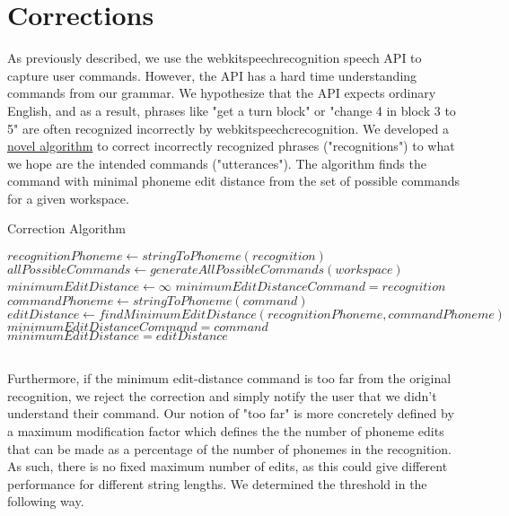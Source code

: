 \documentclass[]{article}
\begin{document}
\clearpage

\section{Corrections}

As previously described, we use the webkitspeechrecognition speech API to capture user commands. However, the API has a hard time understanding commands from our grammar. We hypothesize that the API expects ordinary English, and as a result, phrases like "get a turn block" or "change 4 in block 3 to 5" are often recognized incorrectly by webkitspeechcrecognition. We developed a \hyperref[CorrectionAlgorithm]{novel algorithm} to correct incorrectly recognized phrases ("recognitions") to what we hope are the intended commands ("utterances"). The algorithm finds the command with minimal phoneme edit distance from the set of possible commands for a given workspace.
\begin{algorithm}
	\caption{Correction Algorithm}\label{CorrectionAlgorithm}
	\begin{algorithmic}[1]
		\State $recognitionPhoneme \leftarrow stringToPhoneme(recognition)$
		\State $allPossibleCommands\leftarrow generateAllPossibleCommands(workspace) $
		\State $minimumEditDistance \leftarrow \infty$
		\State $minimumEditDistanceCommand = recognition$
			\State $commandPhoneme \leftarrow stringToPhoneme(command)$
			\State $editDistance \leftarrow findMinimumEditDistance(recognitionPhoneme, commandPhoneme)$
				\State $minimumEditDistanceCommand = command$
				\State $minimumEditDistance = editDistance$
			\EndIf
		\EndFor
		\State {}
		\EndProcedure
	\end{algorithmic}
\end{algorithm}\\
Furthermore, if the minimum edit-distance command is too far from the original recognition, we reject the correction and simply notify the user that we didn't understand their command. Our notion of "too far" is more concretely defined by a maximum modification factor which defines the the number of phoneme edits that can be made as a percentage of the number of phonemes in the recognition. As such, there is no fixed maximum number of edits, as this could give different performance for different string lengths. We determined the threshold in the following way.
\end{document}

